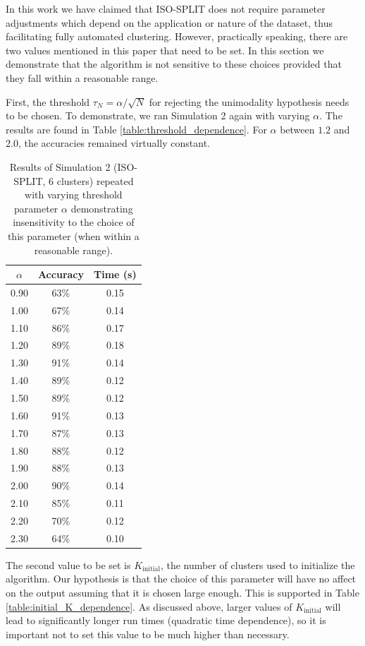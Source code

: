 \documentclass[10pt]{article}
\begin{document}
In this work we have claimed that ISO-SPLIT does not require parameter adjustments which depend on the application or nature of the dataset, thus facilitating fully automated clustering. However, practically speaking, there are two values mentioned in this paper that need to be set. In this section we demonstrate that the algorithm is not sensitive to these choices provided that they fall within a reasonable range.

First, the threshold $\tau_N=\alpha/\sqrt{N}$ for rejecting the unimodality hypothesis needs to be chosen. To demonstrate, we ran Simulation 2 again with varying $\alpha$. The results are found in Table \ref{table:threshold_dependence}. For $\alpha$ between $1.2$ and $2.0$, the accuracies remained virtually constant.

  \begin{table}[t]
\centering
    \begin{tabular}{c|c|c|}
	\textbf{$\alpha$} & \textbf{Accuracy} & \textbf{Time (s)} \\
	\hline
0.90 & 63\% & 0.15 \\
1.00 & 67\% & 0.14 \\
1.10 & 86\% & 0.17 \\
1.20 & 89\% & 0.18 \\
1.30 & 91\% & 0.14 \\
1.40 & 89\% & 0.12 \\
1.50 & 89\% & 0.12 \\
1.60 & 91\% & 0.13 \\
1.70 & 87\% & 0.13 \\
1.80 & 88\% & 0.12 \\
1.90 & 88\% & 0.13 \\
2.00 & 90\% & 0.14 \\
2.10 & 85\% & 0.11 \\
2.20 & 70\% & 0.12 \\
2.30 & 64\% & 0.10 \\
\end{tabular}
\caption{
\label{table:alpha_dependence}
Results of Simulation 2 (ISO-SPLIT, 6 clusters) repeated with varying threshold parameter $\alpha$ demonstrating insensitivity to the choice of this parameter (when within a reasonable range).
}
\end{table}

The second value to be set is $K_{\text{initial}}$, the number of clusters used to initialize the algorithm. Our hypothesis is that the choice of this parameter will have no affect on the output assuming that it is chosen large enough. This is supported in Table \ref{table:initial_K_dependence}. As discussed above, larger values of $K_{\text{initial}}$ will lead to significantly longer run times (quadratic time dependence), so it is important not to set this value to be much higher than necessary. 
\end{document}
